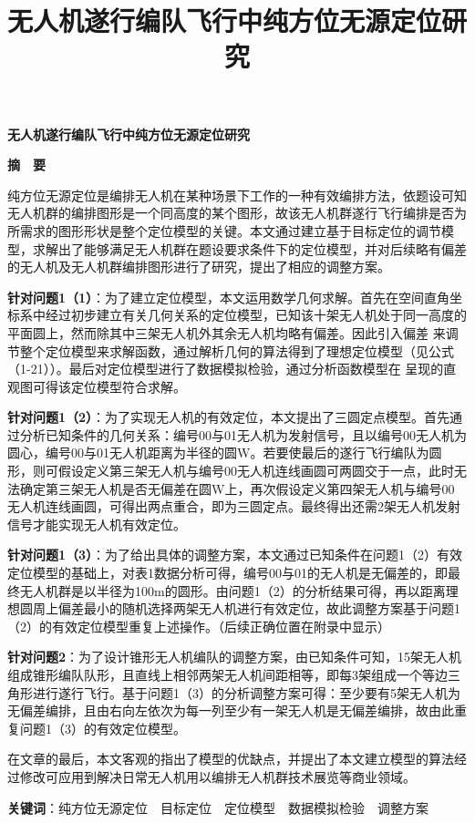 \begin{center}
    \textbf{\fontsize{20}{1.5}无人机遂行编队飞行中纯方位无源定位研究}

    \textbf{摘　要}
\end{center}

\title{无人机遂行编队飞行中纯方位无源定位研究}

纯方位无源定位是编排无人机在某种场景下工作的一种有效编排方法，依题设可知无人机群的编排图形是一个同高度的某个图形，故该无人机群遂行飞行编排是否为所需求的图形形状是整个定位模型的关键。本文通过建立基于目标定位的调节模型，求解出了能够满足无人机群在题设要求条件下的定位模型，并对后续略有偏差的无人机及无人机群编排图形进行了研究，提出了相应的调整方案。

\textbf{针对问题1（1）}：为了建立定位模型，本文运用数学几何求解。首先在空间直角坐标系中经过初步建立有关几何关系的定位模型，已知该十架无人机处于同一高度的平面圆上，然而除其中三架无人机外其余无人机均略有偏差。因此引入偏差 来调节整个定位模型来求解函数，通过解析几何的算法得到了理想定位模型（见公式（1-21））。最后对定位模型进行了数据模拟检验，通过分析函数模型在 呈现的直观图可得该定位模型符合求解。

\textbf{针对问题1（2）}：为了实现无人机的有效定位，本文提出了三圆定点模型。首先通过分析已知条件的几何关系：编号00与01无人机为发射信号，且以编号00无人机为圆心，编号00与01无人机距离为半径的圆W。若要使最后的遂行飞行编队为圆形，则可假设定义第三架无人机与编号00无人机连线画圆可两圆交于一点，此时无法确定第三架无人机是否无偏差在圆W上，再次假设定义第四架无人机与编号00无人机连线画圆，可得出两点重合，即为三圆定点。最终得出还需2架无人机发射信号才能实现无人机有效定位。

\textbf{针对问题1（3）}：为了给出具体的调整方案，本文通过已知条件在问题1（2）有效定位模型的基础上，对表1数据分析可得，编号00与01的无人机是无偏差的，即最终无人机群是以半径为100m的圆形。由问题1（2）的分析结果可得，再以距离理想圆周上偏差最小的随机选择两架无人机进行有效定位，故此调整方案基于问题1（2）的有效定位模型重复上述操作。（后续正确位置在附录中显示）

\textbf{针对问题2}：为了设计锥形无人机编队的调整方案，由已知条件可知，15架无人机组成锥形编队队形，且直线上相邻两架无人机间距相等，即每3架组成一个等边三角形进行遂行飞行。基于问题1（3）的分析调整方案可得：至少要有5架无人机为无偏差编排，且由右向左依次为每一列至少有一架无人机是无偏差编排，故由此重复问题1（3）的有效定位模型。

在文章的最后，本文客观的指出了模型的优缺点，并提出了本文建立模型的算法经过修改可应用到解决日常无人机用以编排无人机群技术展览等商业领域。

\textbf{关键词}：纯方位无源定位　目标定位　定位模型　数据模拟检验　调整方案
